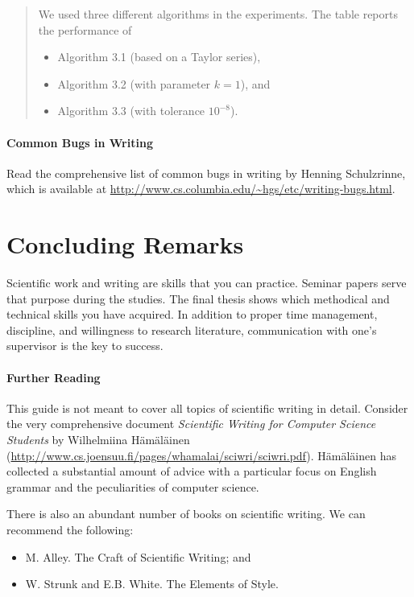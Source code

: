 \begin{quote}
  We used three different algorithms in the experiments. The table reports the performance of
\begin{itemize}
\item Algorithm 3.1 (based on a Taylor series),
\item Algorithm 3.2 (with parameter \(k = 1\)), and
\item Algorithm 3.3 (with tolerance \(10^{-8}\)).
\end{itemize}
\end{quote}

\paragraph{Common Bugs in Writing}
\label{par:commonbugs}
Read the comprehensive list of common bugs in writing by Henning Schulzrinne, which is available at \url{http://www.cs.columbia.edu/~hgs/etc/writing-bugs.html}.

\section{Concluding Remarks}

Scientific work and writing are skills that you can practice. Seminar papers serve that purpose during the studies. The final thesis shows which methodical and technical skills you have acquired. In addition to proper time management, discipline, and willingness to research literature, communication with one's supervisor is the key to success.

\paragraph{Further Reading}

This guide is not meant to cover all topics of scientific writing in detail. Consider the very comprehensive document \emph{Scientific Writing for Computer Science Students} by Wilhelmiina Hämäläinen (\url{http://www.cs.joensuu.fi/pages/whamalai/sciwri/sciwri.pdf}). Hämäläinen has collected a substantial amount of advice with a particular focus on English grammar and the peculiarities of computer science.

There is also an abundant number of books on scientific writing. We can recommend the following:
\begin{itemize}
\item M. Alley. The Craft of Scientific Writing; and
\item W. Strunk and E.B. White. The Elements of Style.
\end{itemize}

